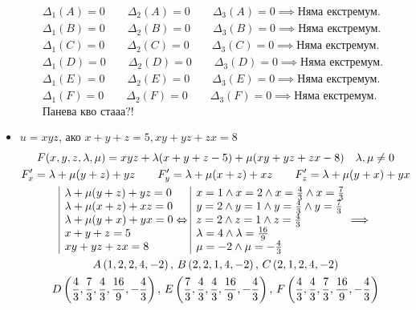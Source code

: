 \documentclass[a4paper,fleqn,12pt]{article}
\theoremstyle{definition}
\begin{document}
\begin{itemize}
\begin{gather*}
\Delta_1(A) = 0 \qquad \Delta_2(A) = 0 \qquad \Delta_3(A) = 0 \implies \text{Няма екстремум.}\\
\Delta_1(B) = 0 \qquad \Delta_2(B) = 0 \qquad \Delta_3(B) = 0 \implies \text{Няма екстремум.}\\
\Delta_1(C) = 0 \qquad \Delta_2(C) = 0 \qquad \Delta_3(C) = 0 \implies \text{Няма екстремум.}\\
\Delta_1(D) = 0 \qquad \Delta_2(D) = 0 \qquad \Delta_3(D) = 0 \implies \text{Няма екстремум.}\\
\Delta_1(E) = 0 \qquad \Delta_2(E) = 0 \qquad \Delta_3(E) = 0 \implies \text{Няма екстремум.}\\
\Delta_1(F) = 0 \qquad \Delta_2(F) = 0 \qquad \Delta_3(F) = 0 \implies \text{Няма екстремум.}\\
\text{Панева кво стааа?!}
\end{gather*}

\item $u = xyz$, ако $x + y + z = 5, xy+yz+zx = 8$ 
\begin{gather*}
F(x,y,z,\lambda, \mu)= xyz +\lambda(x+y+z - 5) + \mu(xy+yz+zx - 8)  \quad \lambda,\mu \neq 0\\
F'_x = \lambda + \mu(y+z) + yz \qquad F'_y = \lambda + \mu(x+z) + xz \qquad F'_z = \lambda + \mu(y+x) + yx\\
\begin{array}{|l@{}}
\lambda + \mu(y+z) + yz = 0\\
\lambda + \mu(x+z) + xz = 0\\
\lambda + \mu(y+x) + yx = 0\\
x + y + z = 5\\
xy+yz+zx = 8
\end{array}\Leftrightarrow 
\begin{array}{|l@{}}
x = 1 \land x = 2 \land x = \frac{4}{3} \land x = \frac{7}{3} \\
y = 2 \land y = 1 \land y = \frac{4}{3} \land y = \frac{7}{3} \\
z = 2 \land z = 1 \land z = \frac{4}{3}\\
\lambda = 4  \land \lambda = \frac{16}{9} \\
\mu = -2 \land \mu = -\frac{4}{3}
\end{array} \implies \\
A \left(1,2,2,4,-2 \right), \, 
B \left(2,2,1,4,-2 \right), \,
C \left(2,1,2,4,-2 \right) \\
D \left(\frac{4}{3},\frac{7}{3},\frac{4}{3},\frac{16}{9},-\frac{4}{3} \right), \,
E \left(\frac{7}{3},\frac{4}{3},\frac{4}{3},\frac{16}{9},-\frac{4}{3} \right), \,
F \left(\frac{4}{3},\frac{4}{3},\frac{7}{3},\frac{16}{9},-\frac{4}{3} \right) \\
\end{gather*}


\end{itemize}
\end{document}
